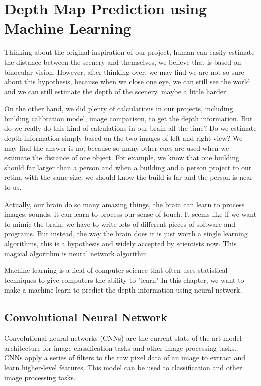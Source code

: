 \chapter{Depth Map Prediction using Machine Learning}

Thinking about the original inspiration of our project, human can easily estimate the distance between the scenery and themselves, we believe that is based on binocular vision. However, after thinking over, we may find we are not so sure about this hypothesis, because when we close one eye, we can still see the world and we can still estimate the depth of the scenery, maybe a little harder. 

On the other hand, we did plenty of calculations in our projects, including building calibration model, image comparison, to get the depth information. But do we really do this kind of calculations in our brain all the time? Do we estimate depth information simply based on the two images of left and right view? We may find the answer is no, because so many other cues are used when we estimate the distance of one object. For example, we know that one building should far larger than a person and when a building and a person project to our retina with the same size, we should know the build is far and the person is near to us. 

Actually, our brain do so many amazing things, the brain can learn to process images, sounds, it can learn to process our sense of touch. It seems like if we want to mimic the brain, we have to write lots of different pieces of software and programs. But instead, the way the brain does it is just worth a single learning algorithms, this is a hypothesis and widely accepted by scientists now. This magical algorithm is neural network algorithm. 

Machine learning is a field of computer science that often uses statistical techniques to give computers the ability to "learn" In this chapter, we want to make a machine learn to predict the depth information using neural network.

\section{Convolutional Neural Network}

Convolutional neural networks (CNNs) are the current state-of-the-art model architecture for image classification tasks and other image processing tasks. CNNs apply a series of filters to the raw pixel data of an image to extract and learn higher-level features. This model can be used  to classification and other image processing tasks.

